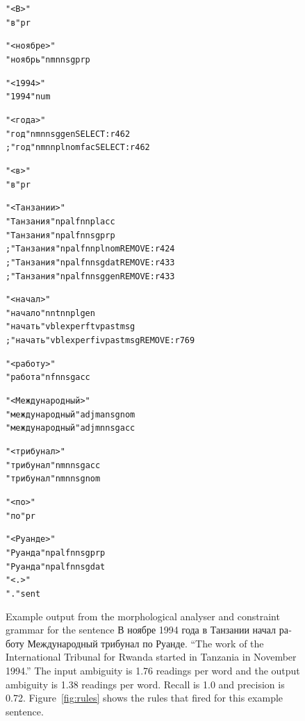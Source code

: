\documentclass[11pt]{article}
\newcommand{\rus}[1]{\foreignlanguage{russian}{#1}}
\begin{document}
\begin{figure}
\centering
\begin{multicols}{2}
\begin{alltt}
{\small

"<\rus{В}>"
    "\rus{в}" pr

"<\rus{ноябре}>"
    "\rus{ноябрь}" n m nn sg prp

"<1994>"
    "1994" num

"<\rus{года}>"
    "\rus{год}" n m nn sg gen SELECT:r462
;   "\rus{год}" n m nn pl nom fac SELECT:r462

"<\rus{в}>"
    "\rus{в}" pr

"<\rus{Танзании}>"
    "\rus{Танзания}" np al f nn pl acc
    "\rus{Танзания}" np al f nn sg prp
;   "\rus{Танзания}" np al f nn pl nom REMOVE:r424
;   "\rus{Танзания}" np al f nn sg dat REMOVE:r433
;   "\rus{Танзания}" np al f nn sg gen REMOVE:r433

"<\rus{начал}>"
    "\rus{начало}" n nt nn pl gen
    "\rus{начать}" vblex perf tv past m sg
;   "\rus{начать}" vblex perf iv past m sg REMOVE:r769

"<\rus{работу}>"
    "\rus{работа}" n f nn sg acc
    
"<\rus{Международный}>"
    "\rus{международный}" adj m an sg nom
    "\rus{международный}" adj m nn sg acc

"<\rus{трибунал}>"
    "\rus{трибунал}" n m nn sg acc
    "\rus{трибунал}" n m nn sg nom

"<\rus{по}>"
    "\rus{по}" pr

"<\rus{Руанде}>"
    "\rus{Руанда}" np al f nn sg prp
    "\rus{Руанда}" np al f nn sg dat
"<.>"
    "." sent
}
\end{alltt}
\end{multicols}
  \caption{Example output from the morphological analyser and constraint grammar for the sentence \rus{В ноябре 1994 
           года в Танзании начал работу Международный трибунал по Руанде.} ``The work of the International Tribunal 
           for Rwanda started in Tanzania in November 1994.'' The input ambiguity is 1.76 readings per word and 
           the output ambiguity is 1.38 readings per word. Recall is 1.0 and precision is 0.72. Figure~\ref{fig:rules} 
           shows the rules that fired for this example sentence.} 
  \label{fig:output}
\end{figure}
\end{document}
